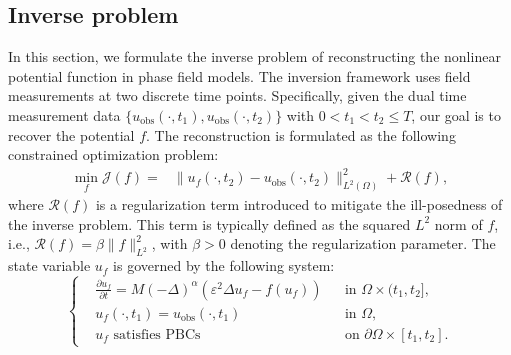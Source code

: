 \documentclass[11pt,reqno]{amsart}
\begin{document}
\subsection{Inverse problem}
In this section, we formulate the inverse problem of reconstructing the nonlinear potential function in phase field models. The inversion framework uses field measurements at two discrete time points. Specifically, given the dual time measurement data $\{u_{\text{obs}}(\cdot,t_1), u_{\text{obs}}(\cdot,t_2)\}$ with $0 < t_1 < t_2 \leq T$, our goal is to recover the potential $f$. The reconstruction is formulated as the following constrained optimization problem:
\begin{equation}
	\label{equ:opt1}
	\begin{aligned}
		\min\limits_{f} \mathcal{J}(f) = &\|u_f(\cdot,t_2) - u_{\text{obs}}(\cdot,t_2)\|_{L^2(\Omega)}^2 + \mathcal{R}(f), 
	\end{aligned}
\end{equation}
where $\mathcal{R}(f)$ is a regularization term introduced to mitigate the ill-posedness of the inverse problem. This term is typically defined as the squared $L^2$ norm of $f$, i.e., $\mathcal{R}(f) = \beta\|f\|_{L^2}^2$, with $\beta > 0$ denoting the regularization parameter. The state variable $u_f$ is governed by the following system:
\begin{equation}
	\label{equ:general_phase}
	\left\{
	\begin{aligned}
		&\frac{\partial u_f}{\partial t} = M(-\Delta)^{\alpha}\left(\varepsilon^2\Delta u_f - f(u_f)\right) && \text{in } \Omega \times (t_1, t_2], \\
		&u_f(\cdot,t_1) = u_{\text{obs}}(\cdot,t_1) && \text{in } \Omega, \\
		&u_f \text{ satisfies PBCs} && \text{on } \partial\Omega \times [t_1, t_2].
	\end{aligned}
	\right.
\end{equation}
\end{document}
